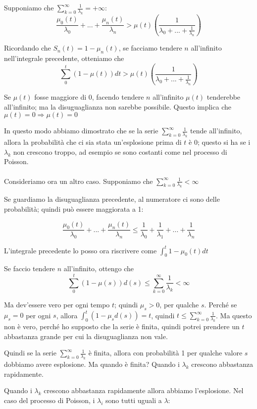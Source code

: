 \documentclass[a4paper,12pt]{book}
\begin{document}
Supponiamo che $ \sum_{k=0}^{\infty} \frac{1}{\lambda_k} = +\infty $:
$$ \frac{\mu_0(t)}{\lambda_0} + ... + \frac{\mu_n(t)}{\lambda_n} > \mu (t) (\frac{1}{\lambda_0 + ... + \frac{1}{\lambda_n}})$$

Ricordando che $ S_n(t) = 1 - \mu_n(t) $, se facciamo tendere $ n $ all'infinito nell'integrale precedente, otteniamo che 
$$ \sum_{0}^{t} (1 - \mu(t)) dt > \mu (t) (\frac{1}{\lambda_0 + ... + \frac{1}{\lambda_n}}) $$

Se $ \mu(t) $ fosse maggiore di 0, facendo tendere $ n $ all'infinito $ \mu (t) $ tenderebbe all'infinito; ma la disuguaglianza non sarebbe possibile. Questo implica che $ \mu(t) = 0 \Rightarrow \mu(t) = 0 $ 

In questo modo abbiamo dimostrato che se la serie $ \sum_{k=0}^{\infty} \frac{1}{\lambda_k} $ tende all'infinito, allora la probabilità che ci sia stata un'esplosione prima di $ t $ è 0; questo si ha se i $\lambda_k$ non crescono troppo, ad esempio se sono costanti come nel processo di Poisson.
\\
\\
Consideriamo ora un altro caso. Supponiamo che $ \sum_{k=0}^{\infty} \frac{1}{\lambda_k} < \infty $  %

Se guardiamo la disuguaglianza precedente, al numeratore ci sono delle probabilità; quindi può essere maggiorata a 1:

$$ \frac{\mu_0(t)}{\lambda_0} + ... + \frac{\mu_n(t)}{\lambda_n} \le \frac{1}{\lambda_0} + \frac{1}{\lambda_1} + ... + \frac{1}{\lambda_n} $$

L'integrale precedente lo posso ora riscrivere come $ \int_0^t 1 - \mu_0 (t) dt $

 Se faccio tendere $ n $ all'infinito, ottengo che 
$$ \sum_0^t (1 - \mu(s)) d(s)  \le \sum_{k=0}^\infty \frac{1}{\lambda_k} < \infty $$ 

Ma dev'essere vero per ogni tempo $ t $; quindi $ \mu_s > 0 $, per qualche $ s $. Perché se $\mu_s = 0$ per ogni $ s $, allora $\int_{0}^{t}(1-\mu_s d(s)) = t$, quindi $ t \le \sum_{k=0}^{\infty}\frac{1}{\lambda_k} $. Ma questo non è vero, perché ho supposto che la serie è finita, quindi potrei prendere un $ t $ abbastanza grande per cui la disuguaglianza non vale.

Quindi se la serie $ \sum_{k=0}^{\infty} \frac{1}{\lambda_k} $ è finita, allora con probabilità 1 per qualche valore $ s $ dobbiamo avere esplosione. Ma quando è finita? Quando i $\lambda_k$ crescono abbastanza rapidamente. 

Quando i $\lambda_k$ crescono abbastanza rapidamente allora abbiamo l'esplosione. Nel caso del processo di Poisson, i $\lambda_i$ sono tutti uguali a $\lambda$:
\end{document}
